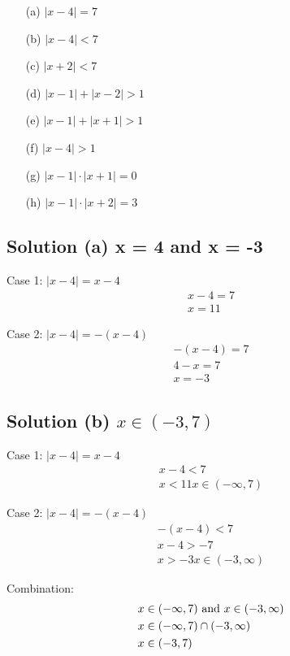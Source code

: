 \documentclass[12pt]{report}
\begin{document}
\begin{multicols}{2}
    \begin{itemize}
        \item[(a)] $\left|x - 4\right| = 7$
        \item[(b)] $\left|x - 4\right| < 7$
        \item[(c)] $\left|x + 2\right| < 7$
        \item[(d)] $\left|x - 1\right| + \left|x - 2\right| > 1$
        \item[(e)] $\left|x - 1\right| + \left|x + 1\right| > 1$
        \item[(f)] $\left|x - 4\right| > 1$
        \item[(g)] $\left|x - 1\right| \cdot \left|x + 1\right| = 0$
        \item[(h)] $\left|x - 1\right| \cdot \left|x + 2\right| = 3$
    \end{itemize}
\end{multicols}

\subsection{Solution (a) x = 4 and x = -3}
Case 1: $|x - 4| = x - 4$
\begin{gather}
    x - 4 = 7\\
    x = 11
\end{gather}

Case 2: $|x - 4| = -(x - 4)$
\begin{gather}
    -(x - 4) = 7\\
    4 - x = 7\\
    x = -3
\end{gather}

\subsection{Solution (b) $x \in (-3,7)$}
Case 1: $|x - 4| = x - 4$
\begin{gather}
    x - 4 < 7\\
    x < 11
    x \in (-\infty,7)
\end{gather}

Case 2: $|x - 4| = -(x - 4)$
\begin{gather}
    -(x - 4) < 7\\
    x - 4 > -7\\
    x > -3
    x \in (-3,\infty)
\end{gather}

Combination:
\begin{align}
    x   &\in (-\infty,7) \text{ and } x \in (-3,\infty)\\
    x   &\in (-\infty,7) \cap (-3,\infty)\\
    x   &\in (-3,7)
\end{align}
\end{document}
